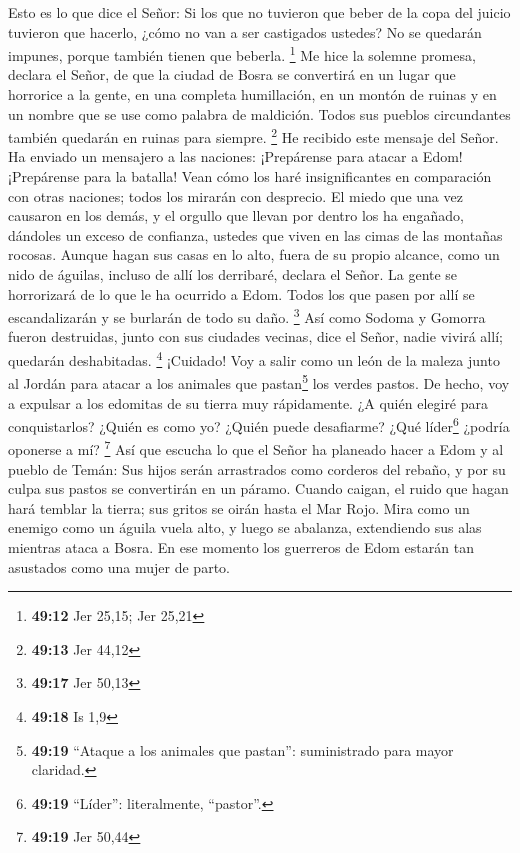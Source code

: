  Esto es lo que dice el Señor: Si los que no tuvieron que
beber de la copa del juicio tuvieron que hacerlo, ¿cómo no van a ser
castigados ustedes? No se quedarán impunes, porque también tienen que
beberla. \footnote{\textbf{49:12} Jer 25,15; Jer 25,21} 
Me hice la solemne promesa, declara el Señor, de que la ciudad de Bosra
se convertirá en un lugar que horrorice a la gente, en una completa
humillación, en un montón de ruinas y en un nombre que se use como
palabra de maldición. Todos sus pueblos circundantes también quedarán en
ruinas para siempre. \footnote{\textbf{49:13} Jer 44,12} 
He recibido este mensaje del Señor. Ha enviado un mensajero a las
naciones: ¡Prepárense para atacar a Edom! ¡Prepárense para la batalla!
 Vean cómo los haré insignificantes en comparación con
otras naciones; todos los mirarán con desprecio.  El
miedo que una vez causaron en los demás, y el orgullo que llevan por
dentro los ha engañado, dándoles un exceso de confianza, ustedes que
viven en las cimas de las montañas rocosas. Aunque hagan sus casas en lo
alto, fuera de su propio alcance, como un nido de águilas, incluso de
allí los derribaré, declara el Señor.  La gente se
horrorizará de lo que le ha ocurrido a Edom. Todos los que pasen por
allí se escandalizarán y se burlarán de todo su daño. \footnote{\textbf{49:17}
  Jer 50,13}  Así como Sodoma y Gomorra fueron
destruidas, junto con sus ciudades vecinas, dice el Señor, nadie vivirá
allí; quedarán deshabitadas. \footnote{\textbf{49:18} Is 1,9}
 ¡Cuidado! Voy a salir como un león de la maleza junto al
Jordán para atacar a los animales que pastan\footnote{\textbf{49:19}
  ``Ataque a los animales que pastan'': suministrado para mayor
  claridad.} los verdes pastos. De hecho, voy a expulsar a los edomitas
de su tierra muy rápidamente. ¿A quién elegiré para conquistarlos?
¿Quién es como yo? ¿Quién puede desafiarme? ¿Qué líder\footnote{\textbf{49:19}
  ``Líder'': literalmente, ``pastor''.} ¿podría oponerse a mí?
\footnote{\textbf{49:19} Jer 50,44}  Así que escucha lo
que el Señor ha planeado hacer a Edom y al pueblo de Temán: Sus hijos
serán arrastrados como corderos del rebaño, y por su culpa sus pastos se
convertirán en un páramo.  Cuando caigan, el ruido que
hagan hará temblar la tierra; sus gritos se oirán hasta el Mar Rojo.
 Mira como un enemigo como un águila vuela alto, y luego
se abalanza, extendiendo sus alas mientras ataca a Bosra. En ese momento
los guerreros de Edom estarán tan asustados como una mujer de parto.

